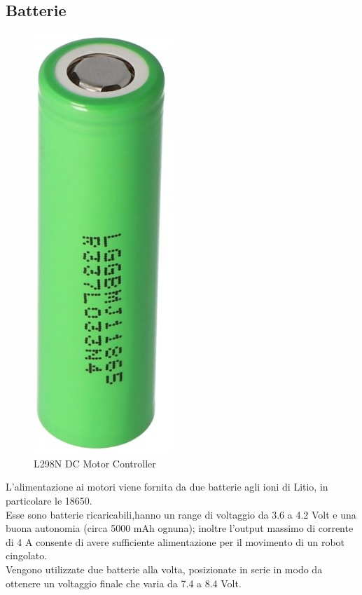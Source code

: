 \documentclass[12pt]{report}
\begin{document}
\subsection*{Batterie}
\begin{figure}
\centering
\vspace{-30pt}
\includegraphics[width=0.4\linewidth]{images/components/18650.jpg} 
\caption{L298N DC Motor Controller}
\vspace{+30pt}
\end{figure}
L'alimentazione ai motori viene fornita da due batterie agli ioni di Litio, in particolare le 18650.\\ Esse sono batterie ricaricabili,hanno un range di voltaggio da 3.6 a 4.2 Volt e una buona autonomia (circa 5000 mAh ognuna); inoltre l'output massimo di corrente di 4 A consente di avere sufficiente alimentazione per il movimento di un robot cingolato.\\
Vengono utilizzate due batterie alla volta, posizionate in serie in modo da ottenere un voltaggio finale che varia da 7.4 a 8.4 Volt.
\end{document}
